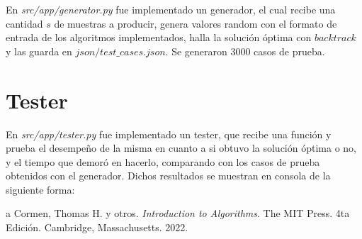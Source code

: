 \documentclass[10pt]{article} %
\begin{document}
	En \textit{src/app/generator.py} fue implementado un generador, el cual recibe una cantidad $ s $ de muestras a producir, genera valores random con el formato de entrada de los algoritmos implementados, halla la soluci\'on \'optima con $ backtrack $ y las guarda en $ json/test\_cases.json $. Se generaron 3000 casos de prueba.
	
	\section{Tester}
	En \textit{src/app/tester.py} fue implementado un tester, que recibe una funci\'on y prueba el desempe\~no de la misma en cuanto a si obtuvo la soluci\'on \'optima o no, y el tiempo que demor\'o en hacerlo, comparando con los casos de prueba obtenidos con el generador. Dichos resultados se muestran en consola de la siguiente forma:
%	 		
	 
	
	
	\begin{thebibliography}
		a
		 Cormen, Thomas H. y otros. \emph{Introduction to Algorithms}. 
		The MIT Press.
		4ta Edici\'on.		
		Cambridge, Massachusetts.
		2022.
	\end{thebibliography}
\end{document}
